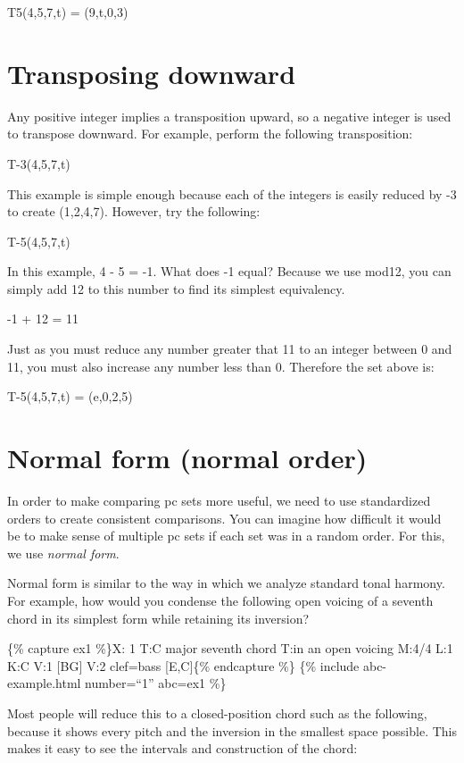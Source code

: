 \documentclass{book}
\begin{document}
T5(4,5,7,t) = (9,t,0,3)

\hypertarget{transposing-downward}{%
\section{Transposing downward}\label{transposing-downward}}

Any positive integer implies a transposition upward, so a negative integer is
used to transpose downward. For example, perform the following transposition:

T-3(4,5,7,t)

This example is simple enough because each of the integers is easily reduced
by -3 to create (1,2,4,7). However, try the following:

T-5(4,5,7,t)

In this example, 4 - 5 = -1. What does -1 equal? Because we use mod12, you can
simply add 12 to this number to find its simplest equivalency.

-1 + 12 = 11

Just as you must reduce any number greater that 11 to an integer between 0 and
11, you must also increase any number less than 0. Therefore the set above is:

T-5(4,5,7,t) = (e,0,2,5)

\hypertarget{normal-form-normal-order}{%
\section{Normal form (normal order)}\label{normal-form-normal-order}}

In order to make comparing pc sets more useful, we need to use standardized
orders to create consistent comparisons. You can imagine how difficult it
would be to make sense of multiple pc sets if each set was in a random order.
For this, we use \emph{normal form}.

Normal form is similar to the way in which we analyze standard tonal harmony.
For example, how would you condense the following open voicing of a seventh
chord in its simplest form while retaining its inversion?

\{\% capture ex1 \%\}X: 1 T:C major seventh chord T:in an open voicing M:4/4
L:1 K:C V:1 {[}BG{]}\textbar{]} V:2 clef=bass {[}E,C{]}\textbar{]}\{\%
endcapture \%\} \{\% include abc-example.html number=``1'' abc=ex1 \%\}

Most people will reduce this to a closed-position chord such as the following,
because it shows every pitch and the inversion in the smallest space possible.
This makes it easy to see the intervals and construction of the chord:
\end{document}
